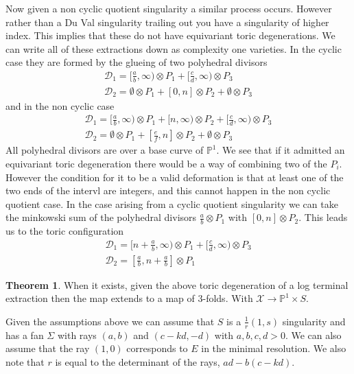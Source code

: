 \documentclass[11pt]{report}
\theoremstyle{definition}
\newtheorem{thm}{Theorem}[section]
\theoremstyle{definition}
\theoremstyle{definition}
\theoremstyle{definition}
\theoremstyle{definition}
\theoremstyle{definition}
\theoremstyle{definition}
\theoremstyle{definition}
\begin{document}
Now given a non cyclic quotient singularity a similar process occurs. However rather than a Du Val singularity trailing out you have a singularity of higher index. This implies that these do not have equivariant toric degenerations. We can write all of these extractions down as complexity one varieties. In the cyclic case they are formed by the glueing of two polyhedral divisors 
\[
\begin{array}{l}
\mathcal{D}_1 = [\frac{a}{b}, \infty) \otimes P_1 + [\frac{c}{d}, \infty) \otimes P_3 \\
\mathcal{D}_2 =  \emptyset \otimes P_1 + [0, n] \otimes P_2 + \emptyset \otimes P_3
\end{array}
\]
and in the non cyclic case 
\[
\begin{array}{l}
\mathcal{D}_1 = [\frac{a}{b}, \infty) \otimes P_1 + [n, \infty) \otimes P_2 + [\frac{c}{d}, \infty) \otimes P_3 \\
\mathcal{D}_2 =  \emptyset \otimes P_1 + [\frac{e}{f}, n] \otimes P_2 + \emptyset \otimes P_3
\end{array}
\]
All polyhedral divisors are over a base curve of $\mathbb{P}^1$. We see that if it admitted an equivariant toric degeneration there would be a way of combining two of the $P_i$. However the condition for it to be a valid deformation is that at least one of the two ends of the intervl are integers, and this cannot happen in the non cyclic quotient case. In the case arising from a cyclic quotient singularity we can take the minkowski sum of the polyhedral divisors $\frac{a}{b} \otimes P_1$ with $[0, n] \otimes P_2$. This leads us to the toric configuration 
\[
\begin{array}{l}
\mathcal{D}_1 = [ n + \frac{a}{b}, \infty) \otimes P_1 + [\frac{c}{d}, \infty) \otimes P_3 \\
\mathcal{D}_2 =  [\frac{a}{b}, n + \frac{a}{b}] \otimes P_1
\end{array}
\]
\newline
\begin{thm}
When it exists, given the above toric degeneration of a log terminal extraction then the map extends to a map of 3-folds. With $\mathcal{X} \rightarrow \mathbb{P}^1 \times S$.
\end{thm}
\vspace{0.1cm}
Given the assumptions above we can assume that $S$ is a $\frac{1}{r}(1,s)$ singularity and has a fan $\Sigma$ with rays $(a,b)$ and $(c-kd,-d)$ with $a,b,c,d  > 0$. We can also assume that the ray $(1,0)$ corresponds to $E$ in the minimal resolution. We also note that $r$ is equal to the determinant of the rays, $ad - b(c-kd)$. 
\end{document}
